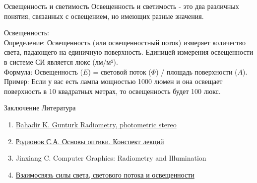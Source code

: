 \documentclass{beamer}
\begin{document}
	\begin{frame}{Освещенность и светимость}
		Освещенность и светимость - это два различных понятия, связанных с освещением, но имеющих разные значения.

    Освещенность: \\
        Определение: Освещенность (или освещенностный поток) измеряет количество света, падающего на единичную поверхность. Единицей измерения освещенности в системе СИ является люкс (лм/м²). \\
        Формула: Освещенность ($E$) = световой поток ($\Phi$) / площадь поверхности ($A$). \\
        Пример: Если у вас есть лампа мощностью 1000 люмен и она освещает поверхность в 10 квадратных метрах, то освещенность будет 100 люкс.

		
	\end{frame}

	\begin{frame}{Заключение}
		Литература
		\begin{enumerate}
			\item \href{https://www.ece.lsu.edu/gunturk/EE4780/EE4780.html}{Bahadir K. Gunturk Radiometry, photometric stereo}
			\item \href{http://aco.ifmo.ru/el_books/basics_optics/glava-2/glava-2-1.html}{Родионов С.А. Основы оптики. Конспект лекций}
			\item Jinxiang C. Computer Graphics: Radiometry and Illumination 
			\item \href{https://novolampa.ru/baza-znaniy/kandely-lyuminy-lyuksy-v-chem-raznitsa}{Взаимосвязь силы света, светового потока и освещенности}
		\end{enumerate}

	\end{frame}
	
\end{document}
